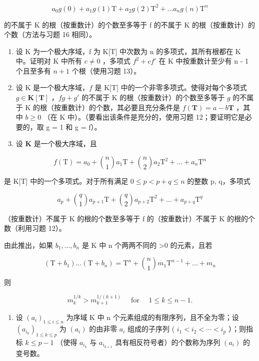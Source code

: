 \[
a _ {0} g (0) + a _ {1} g (1) \mathrm{T} + a _ {2} g (2) \mathrm{T} ^ {2} + \dots a _ {n} g (n) \mathrm{T} ^ {n}
\]

的不属于 K 的根（按重数计）的个数至多等于 f 的不属于 K 的根（按重数计）的个数（方法与习题 16 相同）。

\begin{enumerate}
\def\labelenumi{\arabic{enumi})}
\setcounter{enumi}{17}
\item
  设 K 为一个极大序域，f 为 K{[}T{]} 中次数为 n 的多项式，其所有根都在 K 中。证明对 K 中所有 \(c \neq 0\) ，多项式 \(f^{2} + cf'\) 在 K 中按重数计至少有 n - 1 个且至多有 \(n + 1\) 个根（使用习题 13）。
\item
  设 K 是一个极大序域，\(f\) 是 K{[}T{]} 中的一个非零多项式。使得对每个多项式 \(g \in \mathbf{K}[\mathbf{T}]\) ，\(fg + g'\) 的不属于 K 的根（按重数计）的个数至多等于 \(g\) 的不属于 K 的根（按重数计）的个数，其必要且充分条件是 \(f(\mathbf{T}) = a - b\mathbf{T}\) ，其中 \(b \geqslant 0\) （在 K 中）。（要看出该条件是充分的，使用习题 12；要证明它是必要的，取 g = 1 和 g = f）。
\item
  设 \(\mathbf{K}\) 是一个极大序域，且
\end{enumerate}

\[
f (\mathrm{T}) = a _ {0} + \binom {n} {1} a _ {1} \mathrm{T} + \binom {n} {2} a _ {2} \mathrm{T} ^ {2} + \dots + a _ {n} \mathrm{T} ^ {n}
\]

是 K{[}T{]} 中的一个多项式。对于所有满足 \(0 \leqslant p < p + q \leqslant n\) 的整数 p, q，多项式

\[
a _ {p} + \binom{q}{1} a _ {p + 1} \mathrm{T} + \binom{q}{2} a _ {p + 2} \mathrm{T} ^ {2} + \dots + a _ {p + q} \mathrm{T} ^ {q}
\]

（按重数计）不属于 K 的根的个数至多等于 f 的（按重数计）不属于 K 的根的个数（利用习题 12）。

由此推出，如果 \(b_{1}, \ldots, b_{n}\) 是 K 中 n 个两两不同的 \textgreater0 的元素，且若

\[
\left(\mathrm{T} + b _ {1}\right) \dots \left(\mathrm{T} + b _ {n}\right) = \mathrm{T} ^ {n} + \binom {n} {1} m _ {1} \mathrm{T} ^ {n - 1} + \dots + m _ {n}
\]

则

\[
m _ {k} ^ {1 / k} > m _ {k + 1} ^ {1 / (k + 1)} \quad \text { for } \quad 1 \leqslant k \leqslant n - 1.
\]

\begin{enumerate}
\def\labelenumi{\arabic{enumi})}
\setcounter{enumi}{20}
\tightlist
\item
  设 \((a_{i})_{1 \leqslant i \leqslant n}\) 为序域 K 中 n 个元素组成的有限序列，且不全为零；设 \((a_{i_{k}})_{1 \leqslant k \leqslant p}\) 为 \((a_{i})\) 的由非零 \(a_{i}\) 组成的子序列 ( \(i_{1} < i_{2} < \cdots < i_{p}\) ）；则指标 \(k \leqslant p - 1\) （使得 \(a_{i_{k}}\) 与 \(a_{i_{k+1}}\) 具有相反符号者）的个数称为序列 \((a_{i})\) 的变号数。
\end{enumerate}


